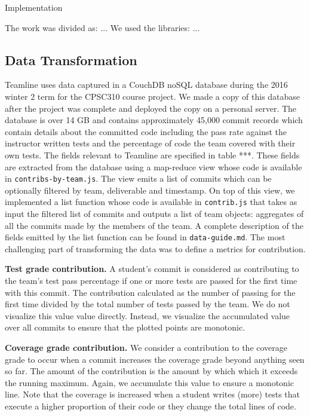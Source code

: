 \documentclass[../manifest.tex]{subfiles}
\begin{document}
Implementation

The work was divided as: ...
We used the libraries: ...

\subsection{Data Transformation}
Teamline uses data captured in a CouchDB noSQL database during the 2016 winter 2 term for the CPSC310 course project. We made a copy of this database after the project was complete and deployed the copy on a personal server. The database is over 14 GB and contains approximately 45,000 commit records which contain details about the committed code including the pass rate against the instructor written tests and the percentage of code the team covered with their own tests. The fields relevant to Teamline are specified in table ***. These fields are extracted from the database using a map-reduce view whose code is available in \texttt{contribs-by-team.js}. The view emits a list of commits which can be optionally filtered by team, deliverable and timestamp. On top of this view, we implemented a list function whose code is available in \texttt{contrib.js} that takes as input the filtered list of commits and outputs a list of team objects: aggregates of all the commits made by the members of the team. A complete description of the fields emitted by the list function can be found in \texttt{data-guide.md}. The most challenging part of transforming the data was to define a metrics for contribution.

\textbf{Test grade contribution.} A student's commit is considered as contributing to the team's test pass percentage if one or more tests are passed for the first time with this commit. The contribution calculated as the number of passing for the first time divided by the total number of tests passed by the team. We do not visualize this value value directly. Instead, we visualize the accumulated value over all commits to ensure that the plotted points are monotonic.

\textbf{Coverage grade contribution.} We consider a contribution to the coverage grade to occur when a commit increases the coverage grade beyond anything seen so far. The amount of the  contribution is the amount by which which it exceeds the running maximum. Again, we accumulate this value to ensure a monotonic line. Note that the coverage is increased when a student writes (more) tests that execute a higher proportion of their code or they change the total lines of code.
\end{document}
